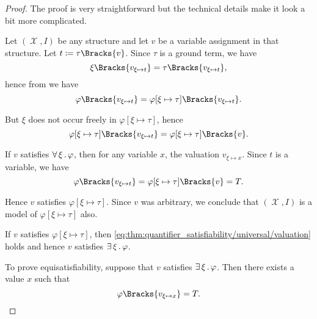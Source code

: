 \begin{proof}
  The proof is very straightforward but the technical details make it look a bit more complicated.

  Let \( (\mscrX, I) \) be any structure and let \( v \) be a variable assignment in that structure. Let \( t \coloneqq \tau\Bracks{v} \). Since \( \tau \) is a ground term, we have
  \begin{equation*}
    \xi\Bracks{v_{\xi \mapsto t}} = \tau\Bracks{v_{\xi \mapsto t}},
  \end{equation*}
  hence from  we have
  \begin{equation*}
    \varphi\Bracks{v_{\xi \mapsto t}}
    =
    \varphi[\xi \mapsto \tau]\Bracks{v_{\xi \mapsto t}}.
  \end{equation*}

  But \( \xi \) does not occur freely in \( \varphi[\xi \mapsto \tau] \), hence
  \begin{equation*}
    \varphi[\xi \mapsto \tau]\Bracks{v_{\xi \mapsto t}}
    =
    \varphi[\xi \mapsto \tau]\Bracks{v}.
  \end{equation*}

   If \( v \) satisfies \( \forall \thinspace \xi \thinspace . \thinspace \varphi \), then for any variable \( x \), the valuation \( v_{\xi \mapsto x} \). Since \( t \) is a variable, we have
  \begin{equation}\label{eq:thm:quantifier_satisfiability/universal/valuation}
    \varphi\Bracks{v_{\xi \mapsto t}}
    =
    \varphi[\xi \mapsto \tau]\Bracks{v}
    =
    T.
  \end{equation}

  Hence \( v \) satisfies \( \varphi[\xi \mapsto \tau] \). Since \( v \) was arbitrary, we conclude that \( (\mscrX, I) \) is a model of \( \varphi[\xi \mapsto \tau] \) also.

   If \( v \) satisfies \( \varphi[\xi \mapsto \tau] \), then \eqref{eq:thm:quantifier_satisfiability/universal/valuation} holds and hence \( v \) satisfies \( \exists \thinspace \xi \thinspace . \thinspace \varphi \).

  To prove equisatisfiability, suppose that \( v \) satisfies \( \exists \thinspace \xi \thinspace . \thinspace \varphi \). Then there exists a value \( x \) such that
  \begin{equation}\label{eq:thm:quantifier_satisfiability/existential/existence_modified_assignment}
    \varphi\Bracks{v_{\xi \mapsto x}} = T.
  \end{equation}


\end{proof}
